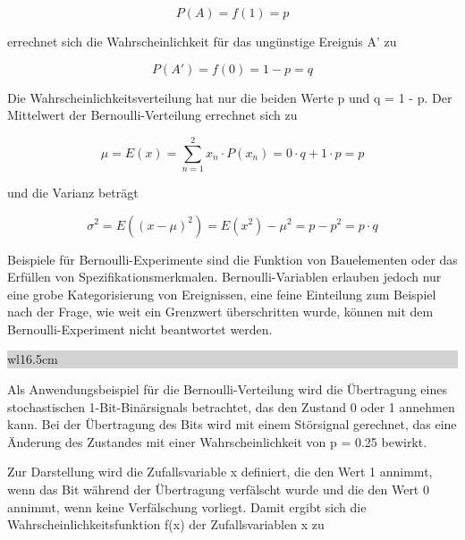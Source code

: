 \begin{equation}\label{eq:fourhundredtwentytwo}
P(A)=f(1)=p
\end{equation}

\noindent errechnet sich die Wahrscheinlichkeit f\"{u}r das ung\"{u}nstige Ereignis A' zu

\begin{equation}\label{eq:fourhundredtwentythree}
P(A')=f(0)=1-p=q
\end{equation}

\noindent Die Wahrscheinlichkeitsverteilung hat nur die beiden Werte p und q = 1 - p. Der Mittelwert der Bernoulli-Verteilung errechnet sich zu

\begin{equation}\label{eq:fourhundredtwentyfour}
\mu =E(x)=\sum _{n=1}^{2}x_{n} \cdot P(x_{n}) =0\cdot q+1\cdot p=p
\end{equation}

\noindent und die Varianz betr\"{a}gt 

\begin{equation}\label{eq:fourhundredtwentyfive}
\sigma ^{2} =E\left((x-\mu)^{2} \right)=E\left(x^{2} \right)-\mu ^{2} =p-p^{2} =p\cdot q
\end{equation}

\noindent Beispiele f\"{u}r Bernoulli-Experimente sind die Funktion von Bauelementen oder das Erf\"{u}llen von Spezifikationsmerkmalen. Bernoulli-Variablen erlauben jedoch nur eine grobe Kategorisierung von Ereignissen, eine feine Einteilung zum Beispiel nach der Frage, wie weit ein Grenzwert \"{u}berschritten wurde, k\"{o}nnen mit dem Bernoulli-Experiment nicht beantwortet werden.

\noindent
\colorbox{lightgray}{%
%
\renewcommand\arraystretch{0.6}%
\begin{tabular}{ wl{16.5cm} }
{}
\end{tabular}%
}\medskip 

\noindent Als Anwendungsbeispiel f\"{u}r die Bernoulli-Verteilung wird die \"{U}bertragung eines stochastischen 1-Bit-Bin\"{a}rsignals betrachtet, das den Zustand 0 oder 1 annehmen kann. Bei der \"{U}bertragung des Bits wird mit einem St\"{o}rsignal gerechnet, das eine \"{A}nderung des Zustandes mit einer Wahrscheinlichkeit von p = 0.25 bewirkt.\newline

\noindent Zur Darstellung wird die Zufallsvariable x definiert, die den Wert 1 annimmt, wenn das Bit w\"{a}hrend der \"{U}bertragung verf\"{a}lscht wurde und die den Wert 0 annimmt, wenn keine Verf\"{a}lschung vorliegt. Damit ergibt sich die Wahrscheinlichkeitsfunktion f(x) der Zufallsvariablen x zu

